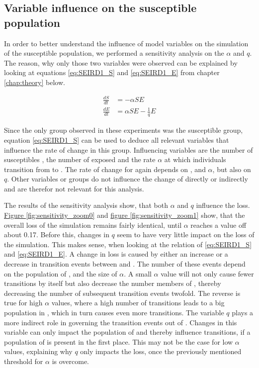\subsection{Variable influence on the susceptible population}
In order to better understand the influence of model variables on the simulation of the
susceptible population, we performed a sensitivity analysis on the $\alpha$ and $q$.
The reason, why only those two variables were observed can be explained by looking at equations
\ref{eq:SEIRD1_S} and \ref{eq:SEIRD1_E} from chapter \ref*{chap:theory} below.

\begin{align*}
	\frac{dS}{dt} &= -\alpha S E \\
	\frac{dE}{dt} &= \alpha S E -\frac{1}{q} E 
\end{align*}


Since the only group observed in these experiments was the susceptible group, equation \ref*{eq:SEIRD1_S}
can be used to deduce all relevant variables that influence the rate of change in this group. Influencing variables are the number of susceptibles ,
the number of exposed  and the rate $\alpha$ at which individuals transition from  to . The rate of change for 
again depends on ,  and $\alpha$, but also on $q$. Other variables or groups do not influence the change of  directly
or indirectly and are therefor not relevant for this analysis. \newline

The results of the sensitivity analysis show,
that both $\alpha$ and $q$ influence the loss. \hyperref[fig:sensitivity_zoom0]{Figure \ref*{fig:sensitivity_zoom0}} and
\hyperref[fig:sensitivity_zoom1]{figure \ref*{fig:sensitivity_zoom1}} show,
that the overall loss of the simulation remains fairly identical, until $\alpha$ reaches a value off about 0.17. Before this,
changes in $q$ seem to have very little impact on the loss of the simulation. This makes sense, when looking at the relation of
\ref*{eq:SEIRD1_S} and \ref*{eq:SEIRD1_E}. A change in loss is caused by either an increase or a decrease in transition events
between  and . The number of these events depend on the population of ,  and the size of $\alpha$.
A small $\alpha$ value will not only cause fewer transitions by itself but also decrease the number members of , thereby 
decreasing the number of subsequent transition events twofold. The reverse is true for high $\alpha$ values, where a high
number of transitions leads to a big population in , which in turn causes even more transitions.
The variable $q$ plays a more indirect role in governing the transition events out of . Changes in this variable
can only impact the population of  and thereby influence  transitions, if a population of  is present in
the first place. This may not be the case for low $\alpha$ values, explaining why $q$ only impacts the loss, once the
previously mentioned threshold for $\alpha$ is overcome.\newline

